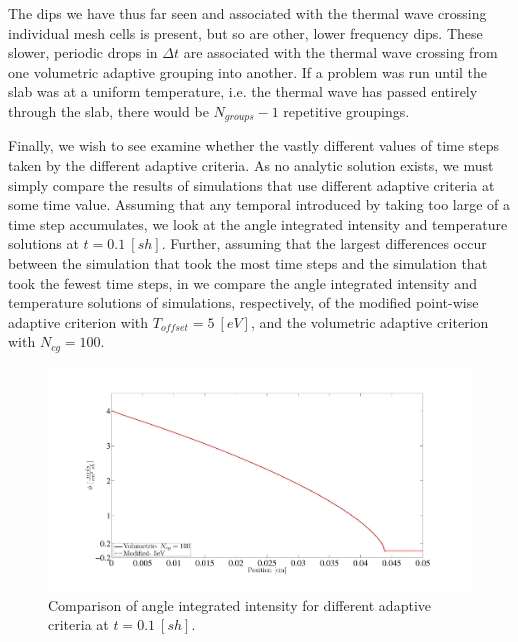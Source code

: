 The dips we have thus far seen and associated with the thermal wave crossing individual mesh cells is present, but so are other, lower frequency dips.
These slower, periodic drops in $\Delta t$ are associated with the thermal wave crossing from one volumetric adaptive grouping into another.  
If a problem was run until the slab was at a uniform temperature, i.e. the thermal wave has passed entirely through the slab, there would be $N_{groups}-1$ repetitive groupings.

Finally, we wish to see examine whether the vastly different values of time steps taken by the different adaptive criteria.
As no analytic solution exists, we must simply compare the results of simulations that use different adaptive criteria at some time value.
Assuming that any temporal introduced by taking too large of a time step accumulates, we look at the angle integrated intensity and temperature solutions at $t=0.1~[sh]$.
Further, assuming that the largest differences occur between the simulation that took the most time steps and the simulation that took the fewest time steps, in  we compare the angle integrated intensity and temperature solutions of simulations, respectively, of the modified point-wise adaptive criterion with $T_{offset} = 5~[eV]$, and the volumetric adaptive criterion with $N_{cg}=100$.
\begin{figure}[!htp]
\centering
\includegraphics[width=16cm,trim=2in  0.4in 0.5in 0.75in,clip=true]{chapter6_grey_radtran/Dissertation_Data/100C_Physical_Marshak_Wave_Radiation_Adaptive_Comparison_Final.pdf}
\caption{Comparison of angle integrated intensity for different adaptive criteria at $t=0.1~[sh]$.}
\label{fig:time_difference_radiation}
\end{figure}
